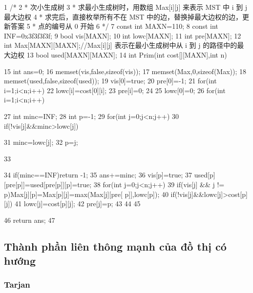 \documentclass[11pt]{article}
\begin{document}
\begin{Code}
 1   /*
 2    * 次小生成树
 3    * 求最小生成树时，用数组 Max[i][j] 来表示 MST 中 i 到 j 最大边权
 4    * 求完后，直接枚举所有不在 MST 中的边，替换掉最大边权的边，更新答案
 5    * 点的编号从 0 开始
 6    */
 7   const int MAXN=110;
 8   const int INF=0x3f3f3f3f;
 9   bool vis[MAXN];
10   int lowc[MAXN];
11   int pre[MAXN];
12   int Max[MAXN][MAXN];//Max[i][j] 表示在最小生成树中从 i 到 j 的路径中的最
        大边权
13   bool used[MAXN][MAXN];
14   int Prim(int cost[][MAXN],int n){
15       int ans=0;
16       memset(vis,false,sizeof(vis));
17       memset(Max,0,sizeof(Max));
18       memset(used,false,sizeof(used));
19       vis[0]=true;
20       pre[0]=-1;
21       for(int i=1;i<n;i++){
22           lowc[i]=cost[0][i];
23           pre[i]=0;
24       }
25       lowc[0]=0;
26       for(int i=1;i<n;i++){
27           int minc=INF;
28           int p=-1;
29           for(int j=0;j<n;j++)
30               if(!vis[j]&&minc>lowc[j]){
31                   minc=lowc[j];
32                   p=j;


33                  }
34              if(minc==INF)return -1;
35              ans+=minc;
36              vis[p]=true;
37              used[p][pre[p]]=used[pre[p]][p]=true;
38              for(int j=0;j<n;j++){
39                  if(vis[j] && j != p)Max[j][p]=Max[p][j]=max(Max[j][pre[
                       p]],lowc[p]);
40                  if(!vis[j]&&lowc[j]>cost[p][j]){
41                      lowc[j]=cost[p][j];
42                      pre[j]=p;
43                  }
44              }
45         }
46         return ans;
47 }
\end{Code}

\subsection{Thành phần liên thông mạnh của đồ thị có hướng}

\subsubsection{Tarjan}
\end{document}
